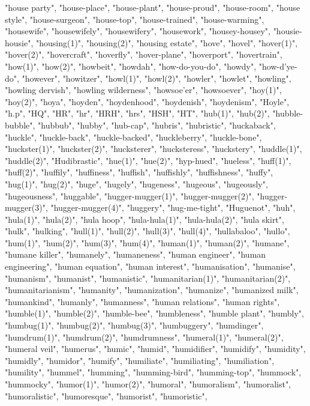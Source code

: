 "house party",
"house-place",
"house-plant",
"house-proud",
"house-room",
"house style",
"house-surgeon",
"house-top",
"house-trained",
"house-warming",
"housewife",
"housewifely",
"housewifery",
"housework",
"housey-housey",
"housie-housie",
"housing(1)",
"housing(2)",
"housing estate",
"hove",
"hovel",
"hover(1)",
"hover(2)",
"hovercraft",
"hoverfly",
"hover-plane",
"hoverport",
"hovertrain",
"how(1)",
"how(2)",
"howbeit",
"howdah",
"how-do-you-do",
"howdy",
"how-d'ye-do",
"however",
"howitzer",
"howl(1)",
"howl(2)",
"howler",
"howlet",
"howling",
"howling dervish",
"howling wilderness",
"howsoe'er",
"howsoever",
"hoy(1)",
"hoy(2)",
"hoya",
"hoyden",
"hoydenhood",
"hoydenish",
"hoydenism",
"Hoyle",
"h.p",
"HQ",
"HR",
"hr",
"HRH",
"hrs",
"HSH",
"HT",
"hub(1)",
"hub(2)",
"hubble-bubble",
"hubbub",
"hubby",
"hub-cap",
"hubris",
"hubristic",
"huckaback",
"huckle",
"huckle-back",
"huckle-backed",
"huckleberry",
"huckle-bone",
"huckster(1)",
"huckster(2)",
"hucksterer",
"hucksteress",
"huckstery",
"huddle(1)",
"huddle(2)",
"Hudibrastic",
"hue(1)",
"hue(2)",
"hyp-hued",
"hueless",
"huff(1)",
"huff(2)",
"huffily",
"huffiness",
"huffish",
"huffishly",
"huffishness",
"huffy",
"hug(1)",
"hug(2)",
"huge",
"hugely",
"hugeness",
"hugeous",
"hugeously",
"hugeousness",
"huggable",
"hugger-mugger(1)",
"hugger-mugger(2)",
"hugger-mugger(3)",
"hugger-mugger(4)",
"huggery",
"hug-me-tight",
"Huguenot",
"huh",
"hula(1)",
"hula(2)",
"hula hoop",
"hula-hula(1)",
"hula-hula(2)",
"hula skirt",
"hulk",
"hulking",
"hull(1)",
"hull(2)",
"hull(3)",
"hull(4)",
"hullabaloo",
"hullo",
"hum(1)",
"hum(2)",
"hum(3)",
"hum(4)",
"human(1)",
"human(2)",
"humane",
"humane killer",
"humanely",
"humaneness",
"human engineer",
"human engineering",
"human equation",
"human interest",
"humanisation",
"humanise",
"humanism",
"humanist",
"humanistic",
"humanitarian(1)",
"humanitarian(2)",
"humanitarianism",
"humanity",
"humanization",
"humanize",
"humanized milk",
"humankind",
"humanly",
"humanness",
"human relations",
"human rights",
"humble(1)",
"humble(2)",
"humble-bee",
"humbleness",
"humble plant",
"humbly",
"humbug(1)",
"humbug(2)",
"humbug(3)",
"humbuggery",
"humdinger",
"humdrum(1)",
"humdrum(2)",
"humdrumness",
"humeral(1)",
"humeral(2)",
"humeral veil",
"humerus",
"humic",
"humid",
"humidifier",
"humidify",
"humidity",
"humidly",
"humidor",
"humify",
"humiliate",
"humiliating",
"humiliation",
"humility",
"hummel",
"humming",
"humming-bird",
"humming-top",
"hummock",
"hummocky",
"humor(1)",
"humor(2)",
"humoral",
"humoralism",
"humoralist",
"humoralistic",
"humoresque",
"humorist",
"humoristic",
